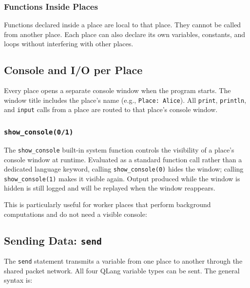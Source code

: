 \subsubsection{Functions Inside Places}

Functions declared inside a place are local to that place. They cannot be
called from another place. Each place can also declare its own variables,
constants, and loops without interfering with other places.

\subsection{Console and I/O per Place}
\label{sec:place-console}

Every place opens a separate console window when the program starts. The
window title includes the place's name (e.g., \texttt{Place: Alice}). All
\texttt{print}, \texttt{println}, and \texttt{input} calls from a place are
routed to that place's console window.

\subsubsection{\texttt{show\_console(0/1)}}

The \texttt{show\_console} built-in system function controls the visibility of a place's
console window at runtime. Evaluated as a standard function call rather than a dedicated language keyword, calling \texttt{show\_console(0)} hides the
window; calling \texttt{show\_console(1)} makes it visible again. Output
produced while the window is hidden is still logged and will be replayed
when the window reappears.

This is particularly useful for worker places that perform background
computations and do not need a visible console:



\subsection{Sending Data: \texttt{send}}
\label{sec:send}

The \texttt{send} statement transmits a variable from one place to another
through the shared packet network. All four QLang variable types can be sent. 
The general syntax is:

